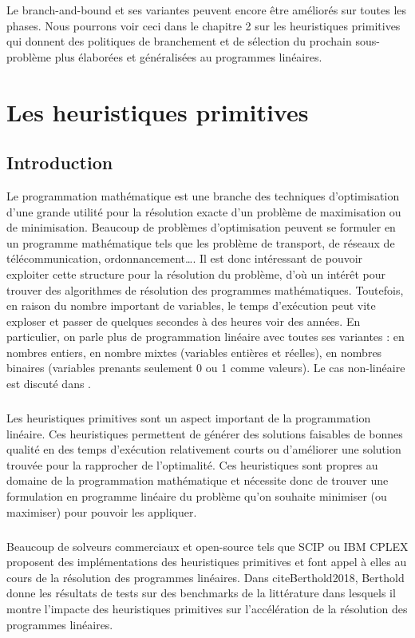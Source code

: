 \documentclass[12pt,a4paper,oneside]{book}
\theoremstyle{definition}
\begin{document}
    Le branch-and-bound et ses variantes peuvent encore être améliorés sur toutes les phases. Nous pourrons voir ceci dans le chapitre 2 sur les heuristiques primitives qui donnent des politiques de branchement et de sélection du prochain sous-problème plus élaborées et généralisées au programmes linéaires.   


	\chapter{Les heuristiques primitives}
	
	\section{Introduction}
	Le programmation mathématique est une branche des techniques d’optimisation d’une grande utilité pour la résolution exacte d’un problème de maximisation ou de minimisation.  Beaucoup de problèmes d’optimisation peuvent se formuler en un programme mathématique tels que les problème de transport, de réseaux de télécommunication, ordonnancement…\cite{Gamrath2015}. Il est donc intéressant de pouvoir exploiter cette structure pour la résolution du problème, d’où un intérêt pour trouver des algorithmes de résolution des programmes mathématiques. Toutefois, en raison du nombre important de variables, le temps d’exécution peut vite exploser et passer de quelques secondes à des heures voir des années. En particulier, on parle plus de programmation linéaire avec toutes ses variantes : en nombres entiers, en nombre mixtes (variables entières et réelles), en nombres binaires (variables prenants seulement 0 ou 1 comme valeurs). Le cas non-linéaire est discuté dans \cite{berthold2014heuristic}.
	
	\paragraph{}
	Les heuristiques primitives sont un aspect important de la programmation linéaire. Ces heuristiques permettent de générer des solutions faisables de bonnes qualité en des temps d’exécution relativement courts ou d’améliorer une solution trouvée pour la rapprocher de l’optimalité. Ces heuristiques sont propres au domaine de la programmation mathématique et nécessite donc de trouver une formulation en programme linéaire du problème qu’on souhaite minimiser (ou maximiser) pour pouvoir les appliquer. 
	
	\paragraph{}
	Beaucoup de solveurs commerciaux et open-source tels que SCIP ou IBM CPLEX proposent des implémentations des heuristiques primitives et font appel à elles au cours de la résolution des programmes linéaires. Dans cite{Berthold2018}, Berthold donne les résultats de tests sur des benchmarks de la littérature dans lesquels il montre l’impacte des heuristiques  primitives sur l’accélération de la résolution des programmes linéaires. 
	
\end{document}

